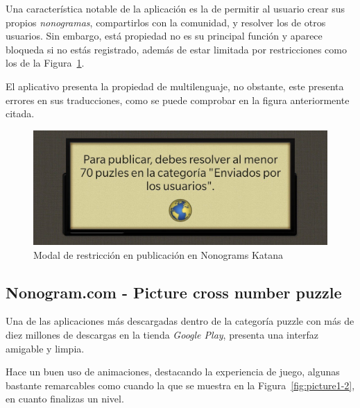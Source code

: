 \documentclass[11pt,spanish,listoffigures,listoftables]{tfgetsinf}
\begin{document}
 Una característica notable de la aplicación es la de permitir al usuario crear sus propios \textit{nonogramas}, compartirlos con la comunidad, y resolver los de
 otros usuarios. Sin embargo, está propiedad no es su principal función y aparece bloqueda si no estás registrado, además de estar limitada por restricciones como los de la 
 Figura~\ref{fig:katana3}.

 El aplicativo presenta la propiedad de multilenguaje, no obstante, este presenta errores en sus traducciones, como se puede comprobar en la figura anteriormente
 citada.

 \begin{figure}[H]
   \centering
   \includegraphics[scale=.175]{images/nonokatana4.jpg}
   \caption{Modal de restricción en publicación en Nonograms Katana}
   \label{fig:katana3}
 \end{figure}
 

\subsection{Nonogram.com - Picture cross number puzzle}

Una de las aplicaciones más descargadas dentro de la categoría puzzle con más de diez millones de descargas en la tienda \textit{Google Play}, 
presenta una interfaz amigable y limpia.

Hace un buen uso de animaciones, destacando la experiencia de juego, algunas bastante remarcables como cuando la que se muestra en la 
Figura~\ref{fig:picture1-2}, en cuanto finalizas un nivel.
\end{document}

